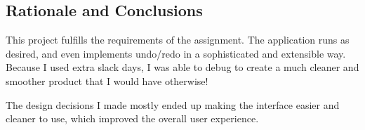 \documentclass[11pt,letterpaper]{article}
\begin{document}
\subsection{Rationale and Conclusions}
This project fulfills the requirements of the assignment. The application runs as desired, and even implements undo/redo in a sophisticated and extensible way. Because I used extra slack days, I was able to debug to create a much cleaner and smoother product that I would have otherwise!

The design decisions I made mostly ended up making the interface easier and cleaner to use, which improved the overall user experience.
\end{document}
